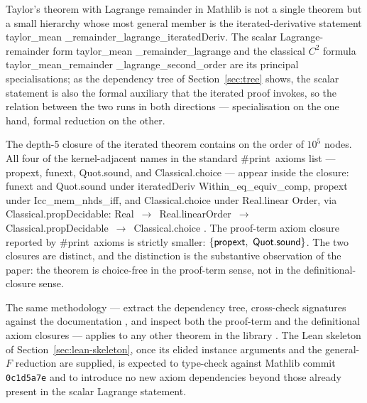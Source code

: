 \documentclass[11pt,reqno]{amsart}
\begin{document}
\noindent Taylor's theorem with Lagrange remainder in Mathlib is not a
single theorem but a small hierarchy whose most general member is the
iterated-derivative statement \textsf{taylor\allowbreak\_mean\allowbreak%
\_remainder\allowbreak\_lagrange\allowbreak \_iterated\allowbreak Deriv}.
The scalar Lagrange-remainder form \textsf{taylor\allowbreak\_mean%
\allowbreak\_remainder\allowbreak\_lagrange} and the classical $C^{2}$
formula \textsf{taylor\allowbreak\_mean\allowbreak\_remainder\allowbreak%
\_lagrange\allowbreak \_second\allowbreak\_order} are its principal
specialisations; as the dependency tree of Section~\ref{sec:tree} shows, the
scalar statement is also the formal auxiliary that the iterated proof
invokes, so the relation between the two runs in both directions ---
specialisation on the one hand, formal reduction on the other.

\noindent The depth-5 closure of the iterated theorem contains on the order
of $10^{5}$ nodes. All four of the kernel-adjacent names in the standard 
\textsf{\#print\ axioms} list --- \textsf{propext}, \textsf{funext}, \textsf{%
Quot\allowbreak.sound}, and \textsf{Classical\allowbreak.choice} --- appear
inside the closure: \textsf{funext} and \textsf{Quot\allowbreak.sound} under 
\textsf{iterated\allowbreak Deriv\allowbreak
Within\allowbreak\_eq\allowbreak\_equiv\allowbreak\_comp}, \textsf{propext}
under \textsf{Icc\allowbreak\_mem\allowbreak\_nhds\allowbreak\_iff}, and 
\textsf{Classical\allowbreak.choice} under \textsf{Real\allowbreak.linear%
\allowbreak Order}, via \textsf{Classical\allowbreak.propDecidable}: \textsf{%
Real}~$\to$~\textsf{Real\allowbreak.linear\allowbreak Order}~$\to$~\textsf{%
Classical\allowbreak.propDecidable}~$\to$~\textsf{Classical\allowbreak.choice%
}. The proof-term axiom closure reported by \textsf{\#print\ axioms} is
strictly smaller: $\{\mathsf{propext},\allowbreak\ \mathsf{%
Quot\allowbreak.sound}\}$. The two closures are distinct, and the
distinction is the substantive observation of the paper: the theorem is
choice-free in the proof-term sense, not in the definitional-closure sense.

\noindent The same methodology --- extract the dependency tree, cross-check
signatures against the documentation \cite{mathlib4-docs}, and inspect both
the proof-term and the definitional axiom closures --- applies to any other
theorem in the library \cite{mathlib4, mathlibgraph2026}. The Lean skeleton
of Section~\ref{sec:lean-skeleton}, once its elided instance arguments and
the general-$F$ reduction are supplied, is expected to type-check against
Mathlib commit \texttt{0c1d5a7e}{} and to introduce no new axiom
dependencies beyond those already present in the scalar Lagrange statement.
\end{document}
